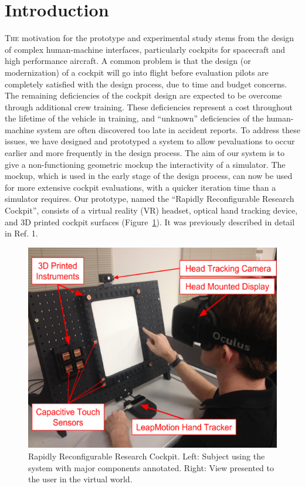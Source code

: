 \documentclass[]{aiaa-tc}%
\begin{document}
\section{Introduction}
\lettrine[nindent=0pt]{T}{he} motivation for the prototype and experimental study stems from the design of complex human-machine interfaces, particularly cockpits for spacecraft and high performance aircraft.
A common problem is that the design (or modernization) of a cockpit will go into flight before evaluation pilots are completely satisfied with the design process, due to time and budget concerns.
The remaining deficiencies of the cockpit design are expected to be overcome through additional crew training.
These deficiencies represent a cost throughout the lifetime of the vehicle in training, and ``unknown'' deficiencies of the human-machine system are often discovered too late in accident reports.
To address these issues, we have designed and prototyped a system to allow pevaluations to occur earlier and more frequently in the design process.
The aim of our system is to give a non-functioning geometric mockup the interactivity of a simulator.
The mockup, which is used in the early stage of the design process, can now be used for more extensive cockpit evaluations, with a quicker iteration time than a simulator requires.
Our prototype, named the ``Rapidly Reconfigurable Research Cockpit'', consists of a virtual reality (VR) headset, optical hand tracking device, and 3D printed cockpit surfaces (Figure~\ref{fig:r3c}).
It was previously described in detail in Ref. 1.
\begin{figure}[tb]
  \centering
  \includegraphics{figures/r3c_callout.png}
  \caption{Rapidly Reconfigurable Research Cockpit. Left: Subject using the system with major components annotated. Right: View presented to the user in the virtual world.}
  \label{fig:r3c}
\end{figure}
\end{document}
